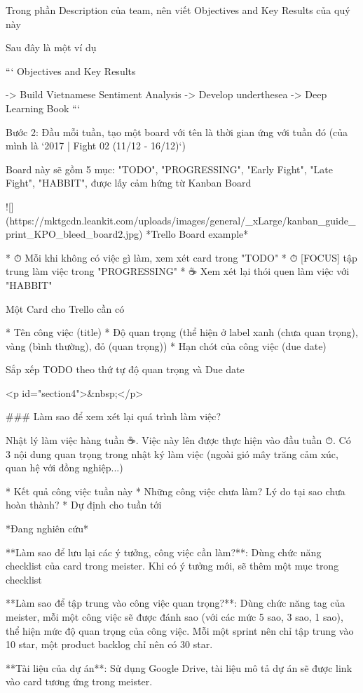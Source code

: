 Trong phần Description của team, nên viết Objectives and Key Results của quý này

Sau đây là một ví dụ

```
Objectives and Key Results

-> Build Vietnamese Sentiment Analysis
-> Develop underthesea
-> Deep Learning Book
```

Bước 2: Đầu mỗi tuần, tạo một board với tên là thời gian ứng với tuần đó (của mình là `2017 | Fight 02 (11/12 - 16/12)`)

Board này sẽ gồm 5 mục: "TODO", "PROGRESSING", "Early Fight", "Late Fight", "HABBIT", được lấy cảm hứng từ Kanban Board

![](https://mktgcdn.leankit.com/uploads/images/general/_xLarge/kanban_guide_print_KPO_bleed_board2.jpg)
*Trello Board example*

* ⏱ Mỗi khi không có việc gì làm, xem xét card trong "TODO"
* ⏱ [FOCUS] tập trung làm việc trong "PROGRESSING"
* ☕ Xem xét lại thói quen làm việc với "HABBIT"

Một Card cho Trello cần có

* Tên công việc (title)
* Độ quan trọng (thể hiện ở label xanh (chưa quan trọng), vàng (bình thường), đỏ (quan trọng))
* Hạn chót của công việc (due date)

Sắp xếp TODO theo thứ tự độ quan trọng và Due date

<p id="section4">&nbsp;</p>

### Làm sao để xem xét lại quá trình làm việc?

Nhật lý làm việc hàng tuần ☕. Việc này lên được thực hiện vào đầu tuần ⏱. Có 3 nội dung quan trọng trong nhật ký làm việc (ngoài gió mây trăng cảm xúc, quan hệ với đồng nghiệp...)

* Kết quả công việc tuần này
* Những công việc chưa làm? Lý do tại sao chưa hoàn thành?
* Dự định cho tuần tới

*Đang nghiên cứu*

**Làm sao để lưu lại các ý tưởng, công việc cần làm?**: Dùng chức năng checklist của card trong meister. Khi có ý tưởng mới, sẽ thêm một mục trong checklist

**Làm sao để tập trung vào công việc quan trọng?**: Dùng chức năng tag của meister, mỗi một công việc sẽ được đánh sao (với các mức 5 sao, 3 sao, 1 sao), thể hiện mức độ quan trọng của công việc. Mỗi một sprint nên chỉ tập trung vào 10 star, một product backlog chỉ nên có 30 star.

**Tài liệu của dự án**: Sử dụng Google Drive, tài liệu mô tả dự án sẽ được link vào card tương ứng trong meister.